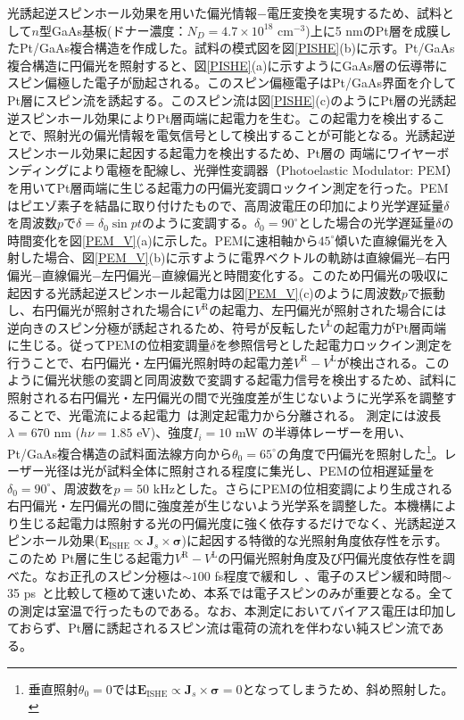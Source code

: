 光誘起逆スピンホール効果を用いた偏光情報−電圧変換を実現するため、試料として$n$型GaAs基板(ドナー濃度：$N_D=4.7 \times 10^{18}$ $\text{cm}^{-3}$)上に5 nmのPt層を成膜したPt/GaAs複合構造を作成した。試料の模式図を図\ref{PISHE}(b)に示す。Pt/GaAs複合構造に円偏光を照射すると、図\ref{PISHE}(a)に示すようにGaAs層の伝導帯にスピン偏極した電子が励起される。このスピン偏極電子はPt/GaAs界面を介してPt層にスピン流を誘起する。このスピン流は図\ref{PISHE}(c)のようにPt層の光誘起逆スピンホール効果によりPt層両端に起電力を生む。この起電力を検出することで、照射光の偏光情報を電気信号として検出することが可能となる。光誘起逆スピンホール効果に起因する起電力を検出するため、Pt層の
両端にワイヤーボンディングにより電極を配線し、光弾性変調器（Photoelastic Modulator: PEM）を用いてPt層両端に生じる起電力の円偏光変調ロックイン測定を行った。PEMはピエゾ素子を結晶に取り付けたもので、高周波電圧の印加により光学遅延量$\delta$を周波数$p$で$\delta=\delta_0\sin pt$のように変調する。$\delta_0=90^\circ$とした場合の光学遅延量$\delta$の時間変化を図\ref{PEM_V}(a)に示した。PEMに速相軸から$45^\circ$傾いた直線偏光を入射した場合、図\ref{PEM_V}(b)に示すように電界ベクトルの軌跡は直線偏光−右円偏光−直線偏光−左円偏光−直線偏光と時間変化する。このため円偏光の吸収に起因する光誘起逆スピンホール起電力は図\ref{PEM_V}(c)のように周波数$p$で振動し、右円偏光が照射された場合に$V^\text{R}$の起電力、左円偏光が照射された場合には逆向きのスピン分極が誘起されるため、符号が反転した$V^\text{L}$の起電力がPt層両端に生じる。従ってPEMの位相変調量$\delta$を参照信号とした起電力ロックイン測定を行うことで、右円偏光・左円偏光照射時の起電力差$V^\text{R}-V^\text{L}$が検出される。このように偏光状態の変調と同周波数で変調する起電力信号を検出するため、試料に照射される右円偏光・左円偏光の間で光強度差が生じないように光学系を調整することで、光電流による起電力~\cite{Pankove}は測定起電力から分離される。
測定には波長$\lambda =670$ nm ($h\nu=1.85$ eV)、強度$I_i=10$ mW の半導体レーザーを用い、Pt/GaAs複合構造の試料面法線方向から$\theta_0=65^\circ$の角度で円偏光を照射した\footnote{垂直照射$\theta_0=0$では$\bm{E}_\text{ISHE}\propto \bm{J}_s\times \bm{\sigma}=0$となってしまうため、斜め照射した。}。レーザー光径は光が試料全体に照射される程度に集光し、PEMの位相遅延量を$\delta_0=90^\circ$、周波数を$p=50$ kHzとした。さらにPEMの位相変調により生成される右円偏光・左円偏光の間に強度差が生じないよう光学系を調整した。本機構により生じる起電力は照射する光の円偏光度に強く依存するだけでなく、光誘起逆スピンホール効果($\bm{E}_\text{ISHE}\propto \bm{J}_s\times \bm{\sigma}$)に起因する特徴的な光照射角度依存性を示す。このため
Pt層に生じる起電力$V^\text{R}-V^\text{L}$の円偏光照射角度及び円偏光度依存性を調べた。なお正孔のスピン分極は$\sim 100$ fs程度で緩和し~\cite{Hilton}、電子のスピン緩和時間$\sim$ 35 ps~\cite{PhysRevB.63.235201}と比較して極めて速いため、本系では電子スピンのみが重要となる。全ての測定は室温で行ったものである。なお、本測定においてバイアス電圧は印加しておらず、Pt層に誘起されるスピン流は電荷の流れを伴わない純スピン流である。





